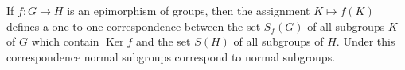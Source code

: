 \begin{theorem}
If $f : G \rightarrow H$ is an epimorphism of groups, then the assignment $K \mapsto f(K)$ defines a one-to-one correspondence between the set $S_f(G)$ of all subgroups $K$ of $G$ which contain $\operatorname{Ker} f$ and the set $S(H)$ of all subgroups of $H$. Under this correspondence normal subgroups correspond to normal subgroups.
\end{theorem}
